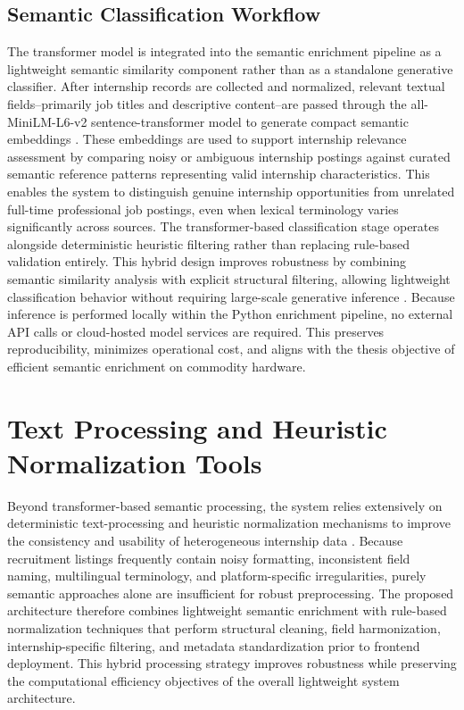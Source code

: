 \subsection{Semantic Classification Workflow}
The transformer model is integrated into the semantic enrichment pipeline as a lightweight semantic similarity component rather than as a standalone generative classifier. After internship records are collected and normalized, relevant textual fields--primarily job titles and descriptive content--are passed through the all-MiniLM-L6-v2 sentence-transformer model to generate compact semantic embeddings \cite{reimers2019sentence, senger2024deep}.
These embeddings are used to support internship relevance assessment by comparing noisy or ambiguous internship postings against curated semantic reference patterns representing valid internship characteristics. This enables the system to distinguish genuine internship opportunities from unrelated full-time professional job postings, even when lexical terminology varies significantly across sources.
The transformer-based classification stage operates alongside deterministic heuristic filtering rather than replacing rule-based validation entirely. This hybrid design improves robustness by combining semantic similarity analysis with explicit structural filtering, allowing lightweight classification behavior without requiring large-scale generative inference \cite{zhang2024nnose, sarawagi2008information}.
Because inference is performed locally within the Python enrichment pipeline, no external API calls or cloud-hosted model services are required. This preserves reproducibility, minimizes operational cost, and aligns with the thesis objective of efficient semantic enrichment on commodity hardware.
\section{Text Processing and Heuristic Normalization Tools}
Beyond transformer-based semantic processing, the system relies extensively on deterministic text-processing and heuristic normalization mechanisms to improve the consistency and usability of heterogeneous internship data \cite{sarawagi2008information, chu2016data}. Because recruitment listings frequently contain noisy formatting, inconsistent field naming, multilingual terminology, and platform-specific irregularities, purely semantic approaches alone are insufficient for robust preprocessing.
The proposed architecture therefore combines lightweight semantic enrichment with rule-based normalization techniques that perform structural cleaning, field harmonization, internship-specific filtering, and metadata standardization prior to frontend deployment. This hybrid processing strategy improves robustness while preserving the computational efficiency objectives of the overall lightweight system architecture.
